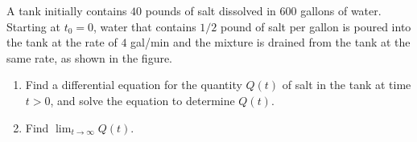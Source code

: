 \documentclass{ximera}
\begin{document}
\begin{example}\label{example:4.2.3}
A tank initially contains $40$ pounds of salt dissolved in 600 gallons
of water. Starting at $t_0 = 0$, water that contains $1/2$ pound of salt
per gallon is poured into the tank at the rate of $4$ gal/min and the
mixture is drained from the tank at the same rate, as shown in the figure.

\begin{center}
\end{center}




\begin{enumerate}
\item \label{item:4.2.3a}
Find a differential equation for the quantity $Q(t)$ of salt in the
tank at time $t > 0$, and solve the equation to determine $Q(t)$.
\item \label{item:4.2.3b}
 Find $\lim_{t\rightarrow\infty}Q(t)$.
\end{enumerate}



\end{example}
\end{document}

